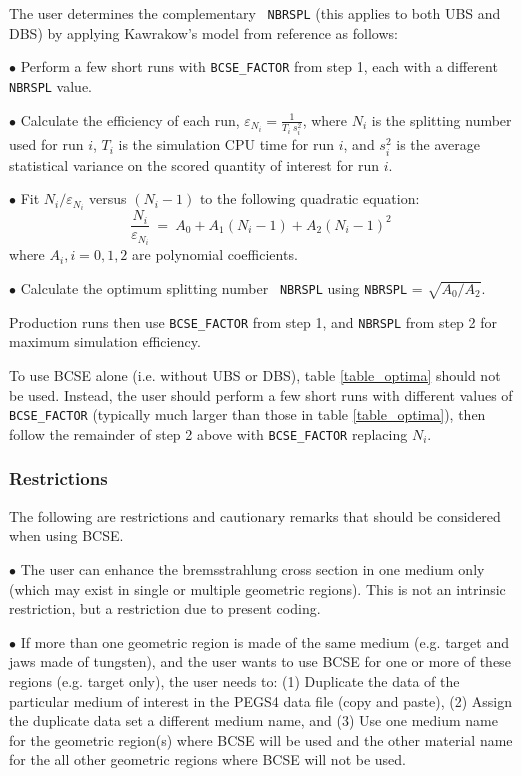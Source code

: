 \documentclass[12pt,twoside]{article}
\begin{document}
 The user determines the complementary {\tt
NBRSPL} (this applies to both UBS and DBS) by applying Kawrakow's
model from reference\cite{MK06} as follows:

\noindent $\bullet$ Perform a few short runs with {\tt BCSE\_FACTOR}
from step 1, each with a different {\tt NBRSPL} value.

\noindent $\bullet$ Calculate the efficiency of each run,
$\varepsilon_{N_{i}} = \frac{1}{T_{i}~s_{i}^{2}}$, where $N_{i}$ is
the splitting number used for run $i$, $T_{i}$ is the simulation CPU
time for run $i$, and $s_{i}^{2}$ is the average statistical variance
on the scored quantity of interest for run $i$.

\noindent $\bullet$ Fit $N_{i}/\varepsilon_{N_{i}}$ versus
$(N_{i}-1)$ to the following quadratic equation:
\begin{equation}
\frac{N_{i}}{\varepsilon_{N_{i}}}~=~A_{0}+A_{1}(N_{i}-1)+A_{2}(N_{i}-1)^{2}
\end{equation}
where $A_{i}, i=0,1,2$ are polynomial coefficients.

\noindent $\bullet$ Calculate the optimum splitting number {\tt
NBRSPL} using {\tt NBRSPL} = $\sqrt{A_{0}/A_{2}}$.

\noindent Production runs then use {\tt BCSE\_FACTOR} from step 1, and
{\tt NBRSPL} from step 2 for maximum simulation efficiency.

\noindent To use BCSE alone (i.e. without UBS or DBS), table
\ref{table_optima} should not be used. Instead, the user should
perform a few short runs with different values of {\tt BCSE\_FACTOR}
(typically much larger than those in table \ref{table_optima}), then
follow the remainder of step 2 above with {\tt BCSE\_FACTOR} replacing
$N_{i}$.

\subsubsection{Restrictions \label{BCSE_restrictions}}

The following are restrictions and cautionary remarks that should be
considered when using BCSE.

\noindent $\bullet$ The user can enhance the bremsstrahlung cross
section in one medium only (which may exist in single or multiple
geometric regions). This is not an intrinsic restriction, but a restriction
due to present coding.

\noindent $\bullet$ If more than one geometric region is made of the
same medium (e.g. target and jaws made of tungsten), and the user wants
to use BCSE for one or more of these regions (e.g. target only), the
user needs to: (1) Duplicate the data of the particular medium of
interest in the PEGS4 data file (copy and paste), (2) Assign the
duplicate data set a different medium name, and (3) Use one medium
name for the geometric region(s) where BCSE will be used and the other
material name for the all other geometric regions where BCSE will not
be used.
\end{document}
